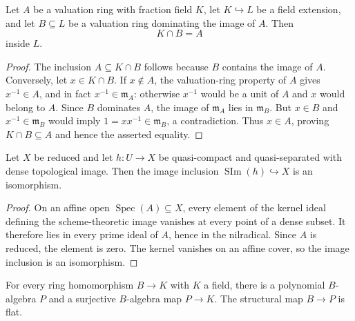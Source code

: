 \begin{lemma}
  \label{lemma:nagata-valuation-intersection}

  Let \(A\) be a valuation ring with fraction field \(K\), let
  \(K\hookrightarrow L\) be a field extension, and let \(B\subseteq L\) be a
  valuation ring dominating the image of \(A\).  Then
  \[
    K\cap B=A
  \]
  inside \(L\).
\end{lemma}

\begin{proof}
  The inclusion \(A\subseteq K\cap B\) follows because $B$ contains the image
  of $A$.  Conversely, let $x\in K\cap B$.  If $x\notin A$, the valuation-ring
  property of $A$ gives $x^{-1}\in A$, and in fact
  $x^{-1}\in\mathfrak m_A$: otherwise $x^{-1}$ would be a unit of $A$ and
  $x$ would belong to $A$.  Since $B$ dominates $A$, the image of
  $\mathfrak m_A$ lies in $\mathfrak m_B$.  But $x\in B$ and
  $x^{-1}\in\mathfrak m_B$ would imply
  $1=xx^{-1}\in\mathfrak m_B$, a contradiction.  Thus $x\in A$, proving
  $K\cap B\subseteq A$ and hence the asserted equality.
\end{proof}

\begin{lemma}
  \label{lemma:nagata-reduced-dense-image-schematic}

  Let $X$ be reduced and let $h\colon U\to X$ be quasi-compact and
  quasi-separated with dense topological image.  Then the image inclusion
  $\operatorname{SIm}(h)\hookrightarrow X$ is an isomorphism.
\end{lemma}

\begin{proof}
  On an affine open $\operatorname{Spec}(A)\subseteq X$, every element of the
  kernel ideal defining the scheme-theoretic image vanishes at every point of
  a dense subset.  It therefore lies in every prime ideal of $A$, hence in
  the nilradical.  Since $A$ is reduced, the element is zero.  The kernel
  vanishes on an affine cover, so the image inclusion is an isomorphism.
\end{proof}

\begin{lemma}
  \label{lemma:nagata-field-point-polynomial-presentation}

  For every ring homomorphism $B\to K$ with $K$ a field, there is a
  polynomial $B$-algebra $P$ and a surjective $B$-algebra map $P\to K$.
  The structural map $B\to P$ is flat.
\end{lemma}

